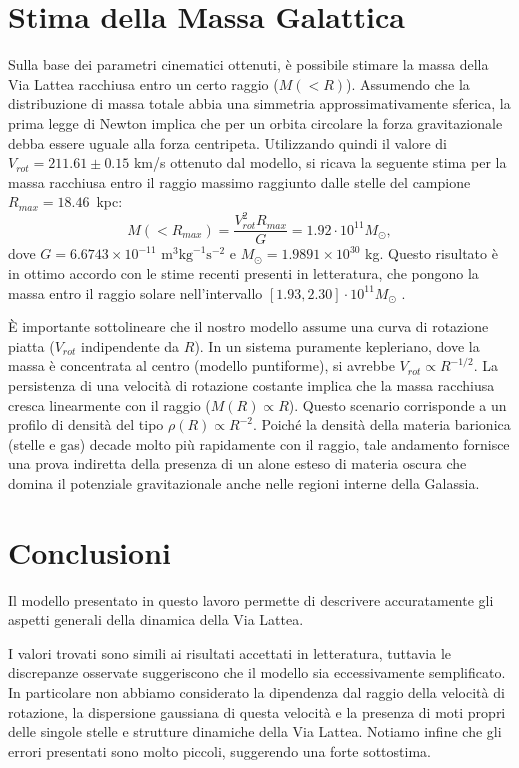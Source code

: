 \documentclass[twocolumn]{article}
\begin{document}
\section{Stima della Massa Galattica}
Sulla base dei parametri cinematici ottenuti, è possibile stimare la massa della Via Lattea racchiusa entro un certo raggio ($M(< R)$). Assumendo che la distribuzione di massa totale abbia una simmetria approssimativamente sferica, la prima legge di Newton implica che per un orbita circolare la forza gravitazionale debba essere uguale alla forza centripeta.
Utilizzando quindi il valore di $V_{rot} = 211.61 \pm 0.15$ km/s ottenuto dal modello, si ricava la seguente stima per la massa racchiusa entro il raggio massimo raggiunto dalle stelle del campione $R_{max}=18.46$~kpc:
\[ M\left( < R_{max} \right) = \frac{V_{rot}^2 R_{max}}{G} = 1.92 \cdot 10^{11} M_\odot, \]
dove $G=6.6743 \times 10^{-11} \text{ m}^3 \text{kg}^{-1} \text{s}^{-2}$ e $M_\odot=1.9891\times 10^{30}$ kg. Questo risultato è in ottimo accordo con le stime recenti presenti in letteratura, che pongono la massa entro il raggio solare nell'intervallo $[1.93, 2.30] \cdot 10^{11} M_\odot$ \cite{Jiao2023}.

È importante sottolineare che il nostro modello assume una curva di rotazione piatta ($V_{rot}$ indipendente da $R$). In un sistema puramente kepleriano, dove la massa è concentrata al centro (modello puntiforme), si avrebbe $V_{rot}\propto R^{-1/2}$. La persistenza di una velocità di rotazione costante implica che la massa racchiusa cresca linearmente con il raggio ($M(R) \propto R$). Questo scenario corrisponde a un profilo di densità del tipo $\rho(R) \propto R^{-2}$. 
Poiché la densità della materia barionica (stelle e gas) decade molto più rapidamente con il raggio, tale andamento fornisce una prova indiretta della presenza di un alone esteso di materia oscura che domina il potenziale gravitazionale anche nelle regioni interne della Galassia.

\section{Conclusioni}
Il modello presentato in questo lavoro permette di descrivere accuratamente gli aspetti generali della dinamica della Via Lattea.

I valori trovati sono simili ai risultati accettati in letteratura, tuttavia le discrepanze osservate suggeriscono che il modello sia eccessivamente semplificato.
In particolare non abbiamo considerato la dipendenza dal raggio della velocità di rotazione, la dispersione gaussiana di questa velocità e la presenza di moti propri delle singole stelle e strutture dinamiche della Via Lattea.
Notiamo infine che gli errori presentati sono molto piccoli, suggerendo una forte sottostima.
\end{document}
